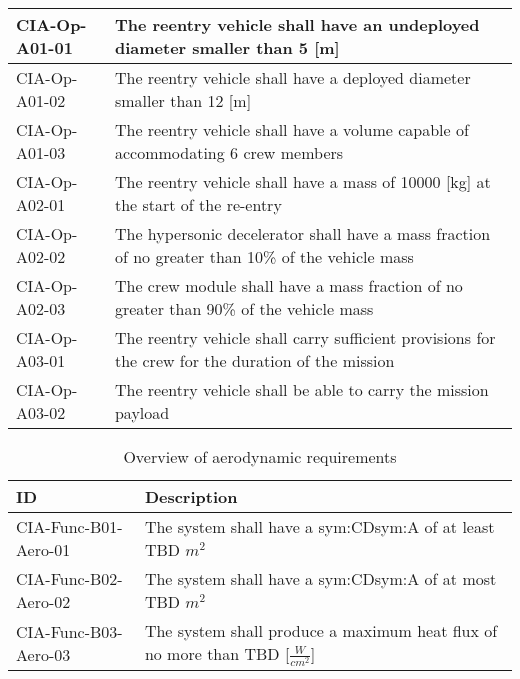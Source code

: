\begin{table}[H]
\begin{tabular}{|p{}|p{}|}
	CIA-Op-A01-01 & The reentry vehicle shall have an undeployed diameter smaller than 5 [m]                         				            \\ \hline
	CIA-Op-A01-02 & The reentry vehicle shall have a deployed diameter smaller than 12 [m]                         				            \\ \hline
	CIA-Op-A01-03 & The reentry vehicle shall have a volume capable of accommodating 6 crew members                        				            \\ \hline
	CIA-Op-A02-01 & The reentry vehicle shall have a mass of 10000 [kg] at the start of the re-entry                       				            \\ \hline
	CIA-Op-A02-02 & The hypersonic decelerator shall have a mass fraction of no greater than 10\% of the vehicle mass  \\ \hline
	CIA-Op-A02-03 & The crew module shall have a mass fraction of no greater than 90\% of the vehicle mass \\ \hline
	CIA-Op-A03-01 & The reentry vehicle shall carry sufficient provisions for the crew for the duration of the mission \\ \hline
	CIA-Op-A03-02 & The reentry vehicle shall be able to carry the mission payload								\\ \hline	
    \end{tabular}
\end{table}


\begin{table}[h]
	\caption*{Overview of aerodynamic requirements}
	\label{tab:aeroreqs}
	\begin{tabular}{|p{}|p{}|}
		\hline
		ID & Description \\
		\hline \hline
		CIA-Func-B01-Aero-01 & The system shall have a \gls{sym:CD}\gls{sym:A} of at least TBD $m^{2}$ \\ \hline
		CIA-Func-B02-Aero-02 & The system shall have a \gls{sym:CD}\gls{sym:A} of at most TBD $m^{2}$ \\ \hline
		CIA-Func-B03-Aero-03 & The system shall produce a maximum heat flux of no more than TBD [$\frac{W}{cm^{2}}$] \\ \hline
	\end{tabular}
\end{table}

